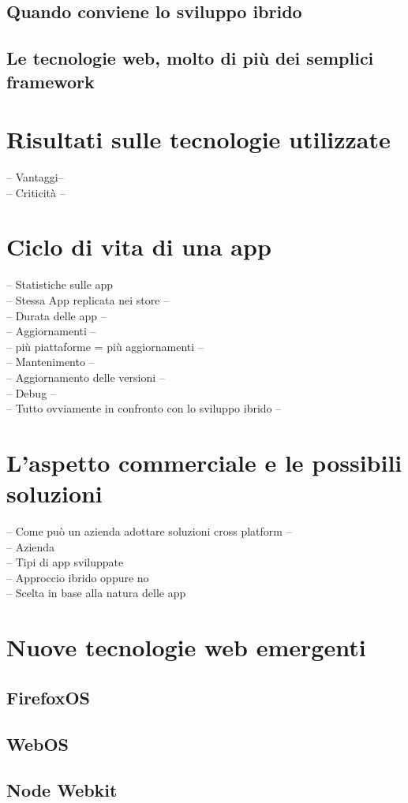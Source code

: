 \subsection{Quando conviene lo sviluppo ibrido}

\subsection{Le tecnologie web, molto di più dei semplici framework}

\section{Risultati sulle tecnologie utilizzate}

-- Vantaggi-- \\
-- Criticità --\\


\section{Ciclo di vita di una app}
-- Statistiche sulle app\\
	-- Stessa App replicata nei store --\\
	-- Durata delle app --\\
-- Aggiornamenti --\\
	-- più piattaforme = più aggiornamenti --\\
-- Mantenimento --\\
	-- Aggiornamento delle versioni --\\
	-- Debug --\\
-- Tutto ovviamente in confronto con lo sviluppo ibrido --

\section{L'aspetto commerciale e le possibili soluzioni}

-- Come può un azienda adottare soluzioni cross platform --\\
-- Azienda\\
	-- Tipi di app sviluppate\\
	-- Approccio ibrido oppure no\\
	-- Scelta in base alla natura delle app

\section{Nuove tecnologie web emergenti}

\subsection{FirefoxOS}

\subsection{WebOS}

\subsection{Node Webkit}